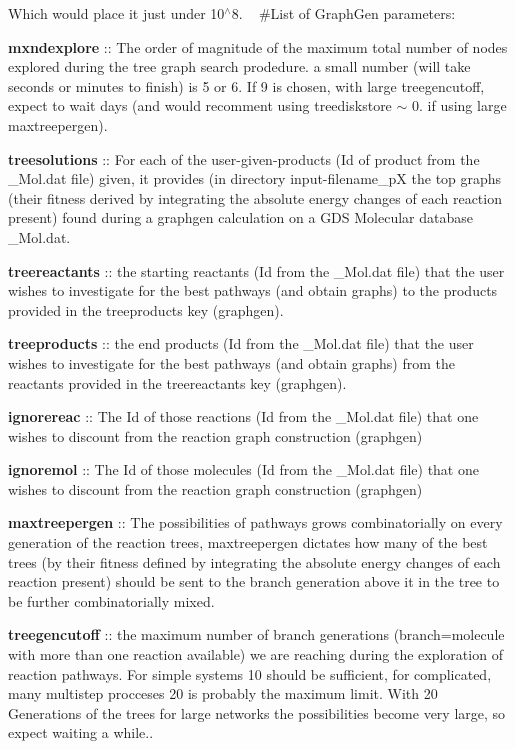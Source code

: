 Which would place it just under 10$^\wedge$8. ~\newline
 \#\+List of Graph\+Gen parameters\+:


\begin{DoxyItemize}
\item {\bfseries mxndexplore} \+:\+: The order of magnitude of the maximum total number of nodes explored during the tree graph search prodedure. a small number (will take seconds or minutes to finish) is 5 or 6. If 9 is chosen, with large treegencutoff, expect to wait days (and would recomment using treediskstore $\sim$ 0. if using large maxtreepergen).
\item {\bfseries treesolutions} \+:\+: For each of the user-\/given-\/products (Id of product from the \+\_\+\+Mol.\+dat file) given, it provides (in directory input-\/filename\+\_\+pX the top graphs (their fitness derived by integrating the absolute energy changes of each reaction present) found during a graphgen calculation on a G\+DS Molecular database \+\_\+\+Mol.\+dat.
\item {\bfseries treereactants} \+:\+: the starting reactants (Id from the \+\_\+\+Mol.\+dat file) that the user wishes to investigate for the best pathways (and obtain graphs) to the products provided in the treeproducts key (graphgen).
\item {\bfseries treeproducts} \+:\+: the end products (Id from the \+\_\+\+Mol.\+dat file) that the user wishes to investigate for the best pathways (and obtain graphs) from the reactants provided in the treereactants key (graphgen).
\item {\bfseries ignorereac} \+:\+: The Id of those reactions (Id from the \+\_\+\+Mol.\+dat file) that one wishes to discount from the reaction graph construction (graphgen)
\item {\bfseries ignoremol} \+:\+: The Id of those molecules (Id from the \+\_\+\+Mol.\+dat file) that one wishes to discount from the reaction graph construction (graphgen)
\item {\bfseries maxtreepergen} \+:\+: The possibilities of pathways grows combinatorially on every generation of the reaction trees, maxtreepergen dictates how many of the best trees (by their fitness defined by integrating the absolute energy changes of each reaction present) should be sent to the branch generation above it in the tree to be further combinatorially mixed.
\item {\bfseries treegencutoff} \+:\+: the maximum number of branch generations (branch=molecule with more than one reaction available) we are reaching during the exploration of reaction pathways. For simple systems 10 should be sufficient, for complicated, many multistep procceses 20 is probably the maximum limit. With 20 Generations of the trees for large networks the possibilities become very large, so expect waiting a while..

\end{DoxyItemize}
